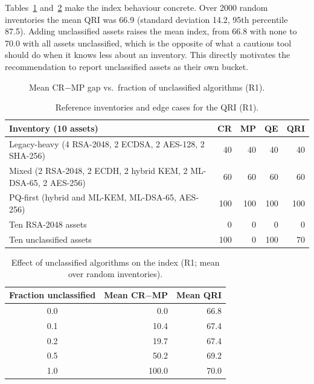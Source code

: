 \documentclass[conference]{IEEEtran}
\begin{document}
Tables~\ref{tab:refinv} and~\ref{tab:unclass} make the index behaviour concrete. Over 2000 random inventories the mean QRI was 66.9 (standard deviation 14.2, 95th percentile 87.5). Adding unclassified assets raises the mean index, from 66.8 with none to 70.0 with all assets unclassified, which is the opposite of what a cautious tool should do when it knows less about an inventory. This directly motivates the recommendation to report unclassified assets as their own bucket.

\begin{figure}[t]
\centering
{}
\caption{Mean CR$-$MP gap vs.\ fraction of unclassified algorithms (R1).}
\label{fig:gap}
\end{figure}

\begin{table}[t]
\caption{Reference inventories and edge cases for the QRI (R1).}
\label{tab:refinv}
\centering
\footnotesize
\setlength{\tabcolsep}{3pt}
\begin{tabular}{@{}p{4.2cm} r r r r@{}}
\toprule
Inventory (10 assets) & CR & MP & QE & QRI \\
\midrule
Legacy-heavy (4 RSA-2048, 2 ECDSA, 2 AES-128, 2 SHA-256) & 40 & 40 & 40 & 40 \\
Mixed (2 RSA-2048, 2 ECDH, 2 hybrid KEM, 2 ML-DSA-65, 2 AES-256) & 60 & 60 & 60 & 60 \\
PQ-first (hybrid and ML-KEM, ML-DSA-65, AES-256) & 100 & 100 & 100 & 100 \\
Ten RSA-2048 assets & 0 & 0 & 0 & 0 \\
Ten unclassified assets & 100 & 0 & 100 & 70 \\
\bottomrule
\end{tabular}
\end{table}

\begin{table}[t]
\caption{Effect of unclassified algorithms on the index (R1; mean over random inventories).}
\label{tab:unclass}
\centering
\footnotesize
\begin{tabular}{@{}c r r@{}}
\toprule
Fraction unclassified & Mean CR$-$MP & Mean QRI \\
\midrule
0.0 & 0.0 & 66.8 \\
0.1 & 10.4 & 67.4 \\
0.2 & 19.7 & 67.4 \\
0.5 & 50.2 & 69.2 \\
1.0 & 100.0 & 70.0 \\
\bottomrule
\end{tabular}
\end{table}
\end{document}

